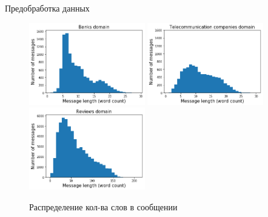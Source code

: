 \documentclass{beamer}
\begin{document}
\begin{frame}{Предобработка данных}

\begin{figure}[!h]
\caption{Распределение кол-ва слов в сообщении}
\includegraphics[width=0.45\textwidth]{images/mess_len_bank.png}
\includegraphics[width=0.45\textwidth]{images/mess_len_tkk2.png}
\\
\includegraphics[width=0.45\textwidth]{images/mess_len_reviews.png}
\end{figure}

\end{frame}
\end{document}
